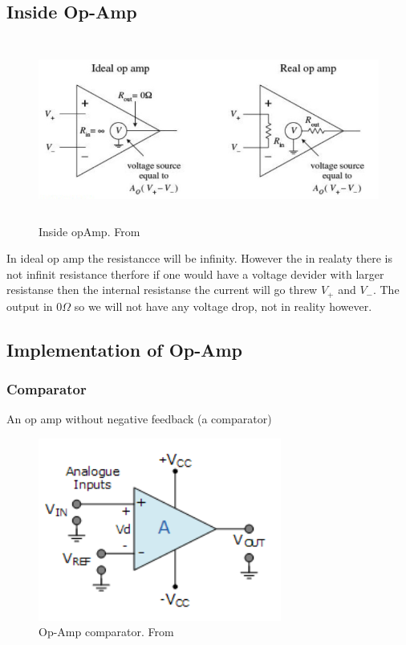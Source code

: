 \subsection{Inside Op-Amp}
\begin{figure}[h]
    \vspace{10mm}
    \centering
    \includegraphics[width=12cm, height=6cm]{image/inside-opamp.png}
    \caption{Inside opAmp. From \cite{}}
\end{figure}
In ideal op amp the resistancce will be infinity. However the in realaty
there is not infinit resistance therfore if one would have a voltage devider
with larger resistanse then the internal resistanse the current will 
go threw $V_+$ and $V_-$. The output in $0\Omega$ so we will not have any
voltage drop, not in reality however.

\newpage
\subsection{Implementation of Op-Amp}
\subsubsection{Comparator}
An op amp without negative feedback (a comparator)
\begin{figure}[h]
    \vspace{10mm}
    \centering
    \includegraphics[width=8cm, height=6cm]{image/op-amp-comparator.png}
    \caption{Op-Amp comparator. From \cite{}}
\end{figure}

